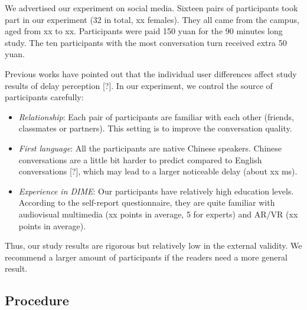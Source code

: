 We advertised our experiment on social media. Sixteen pairs of participants took part in our experiment (32 in total, xx females). They all came from the campus, aged from xx to xx. Participants were paid 150 yuan for the 90 minutes long study. The ten participants with the most conversation turn received extra 50 yuan.

Previous works have pointed out that the individual user differences affect study results of delay perception [?]. In our experiment, we control the source of participants carefully:

\begin{itemize}
    \item \emph{Relationship}: Each pair of participants are familiar with each other (friends, classmates or partners). This setting is to improve the conversation quality.
    
    \item \emph{First language}: All the participants are native Chinese speakers. Chinese conversations are a little bit harder to predict compared to English conversations [?], which may lead to a larger noticeable delay (about xx ms).
    
    \item \emph{Experience in DIME}: Our participants have relatively high education levels. According to the self-report questionnaire, they are quite familiar with audiovisual multimedia (xx points in average, 5 for experts) and AR/VR (xx points in average).
\end{itemize}

Thus, our study results are rigorous but relatively low in the external validity. We recommend a larger amount of participants if the readers need a more general result.

\subsection{Procedure}


